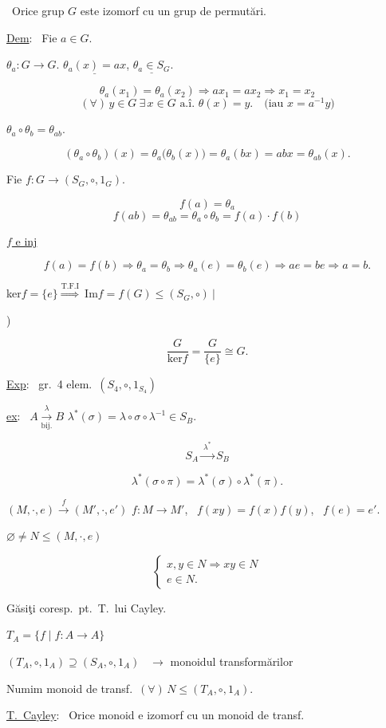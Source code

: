 \documentclass[12pt]{article}
\begin{document}
\noindent{} \ Orice grup $G$ este izomorf cu un grup de permutări.

\bigskip
\noindent\underline{Dem}: \ Fie $a\in G$.

\noindent $\theta_a: G\to G$. \quad $\underline{\theta_a(x)=ax}$, \quad $\underline{\theta_a\in S_G}$.

\[
\theta_a(x_1)=\theta_a(x_2) \Rightarrow ax_1=ax_2 \Rightarrow x_1=x_2
\]
\[
(\forall)\,y\in G \ \exists\,x\in G \text{ a.î. } \theta(x)=y. \quad \text{(iau } x=a^{-1}y\text{)}
\]

\bigskip
\noindent\underline{$\theta_a\circ\theta_b = \theta_{ab}$}.

\[
(\theta_a\circ\theta_b)(x) = \theta_a\big(\theta_b(x)\big) = \theta_a(bx) = abx = \theta_{ab}(x).
\]

\bigskip
\noindent Fie $f: G \to (S_G,\circ,1_G)$.

\[
f(a) = \theta_a
\]
\[
f(ab) = \theta_{ab} = \theta_a\circ\theta_b = f(a)\cdot f(b)
\]

\bigskip
\noindent\underline{$f$ e inj}

\[
f(a)=f(b) \Rightarrow \theta_a=\theta_b \Rightarrow \theta_a(e)=\theta_b(e) \Rightarrow ae=be \Rightarrow a=b.
\]

\bigskip
\noindent ker$f=\{e\} \overset{\text{T.F.I}}{\Longrightarrow} \ \text{Im}f = f(G) \leq (S_G,\circ) \ \Big|$

)

\[
\frac{G}{\text{ker}f} = \frac{G}{\{e\}} \cong G.
\]

\bigskip
\noindent\underline{Exp}: \ gr.\ 4 elem.\ $(S_4,\circ,1_{S_4})$

\bigskip
\noindent\underline{ex}: \ $A \xrightarrow[\text{bij.}]{\ \lambda\ } B$ \qquad $\lambda^*(\sigma) = \lambda\circ\sigma\circ\lambda^{-1} \in S_B$.

\[
S_A \xrightarrow{\ \lambda^*\ } S_B
\]

\[
\lambda^*(\sigma\circ\pi) = \lambda^*(\sigma)\circ\lambda^*(\pi).
\]

\bigskip
\noindent $(M,\cdot,e) \xrightarrow{\ f\ } (M',\cdot,e')$ \quad $f:M\to M'$, \ $f(xy)=f(x)f(y)$, \ $f(e)=e'$.

\bigskip
\noindent $\varnothing \neq N \leq (M,\cdot,e)$

\[
\begin{cases}
x,y\in N \Rightarrow xy\in N\\
e\in N.
\end{cases}
\]

\bigskip
\noindent Găsiţi coresp.\ pt.\ T.\ lui Cayley.

\bigskip
\noindent $T_A = \{f \mid f:A\to A\}$

\noindent $(T_A,\circ,1_A) \supseteq (S_A,\circ,1_A)$ \ $\to$ monoidul transformărilor

\bigskip
\noindent Numim monoid de transf.\ $(\forall)\,N\leq (T_A,\circ,1_A)$.

\bigskip
\noindent\underline{T.\ Cayley}: \ Orice monoid e izomorf cu un monoid de transf.
\end{document}
